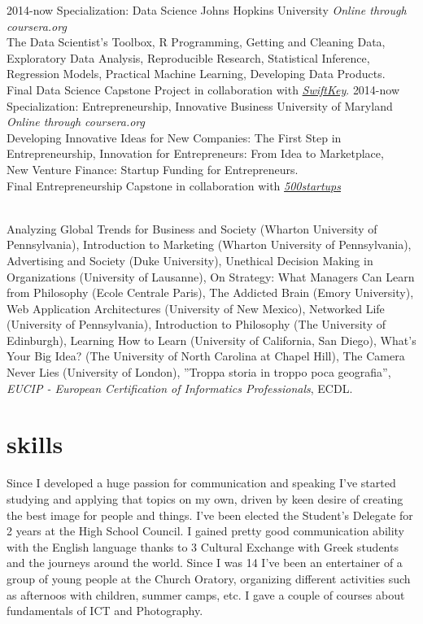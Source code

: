 \documentclass[]{friggeri-cv}
\begin{document}
\begin{entrylist}
  \entry
    {2014-now}
    {Specialization: Data Science}
    {Johns Hopkins University}
    {\emph{Online through coursera.org}\\
    The Data Scientist’s Toolbox, R Programming, Getting and Cleaning Data, \\Exploratory Data Analysis, Reproducible Research, Statistical Inference, \\Regression Models, Practical Machine Learning, Developing Data Products.\\
    Final Data Science Capstone Project in collaboration with \emph{\href{http://swiftkey.com/it/}{SwiftKey}}.
    }
\entry
    {2014-now}
    {Specialization: Entrepreneurship, Innovative Business}
    {University of Maryland}
    {\emph{Online through coursera.org}\\
    Developing Innovative Ideas for New Companies: The First Step in Entrepreneurship, Innovation for Entrepreneurs: From Idea to Marketplace,\\ New Venture Finance: Startup Funding for Entrepreneurs. \\
    Final Entrepreneurship Capstone in collaboration with \emph{\href{http://500.co/startups}{500startups}}
    }
\end{entrylist}\\

Analyzing Global Trends for Business and Society (Wharton University of Pennsylvania), Introduction to Marketing (Wharton University of Pennsylvania), Advertising and Society (Duke University), Unethical Decision Making in Organizations (University of Lausanne), On Strategy: What Managers Can Learn from Philosophy (Ecole Centrale Paris), The Addicted Brain (Emory University), Web Application Architectures (University of New Mexico), Networked Life (University of Pennsylvania), Introduction to Philosophy
(The University of Edinburgh), Learning How to Learn (University of California, San Diego), What's Your Big Idea? (The University of North Carolina at Chapel Hill), The Camera Never Lies (University of London), ''Troppa storia in troppo poca geografia'', \emph{EUCIP - European Certification of Informatics Professionals}, ECDL.


\section{skills}

Since I developed a huge passion for communication and speaking I've started studying and applying that topics on my own, driven by keen desire of creating the best image for people and things. I've been elected the Student's Delegate for 2 years at the High School Council. I gained pretty good communication ability with the English language thanks to 3 Cultural Exchange with Greek students and the journeys around the world. Since I was 14 I've been an entertainer of a group of young people at the Church Oratory, organizing different activities such as afternoos with children, summer camps, etc. I gave a couple of courses about fundamentals of ICT and Photography.
\end{document}
